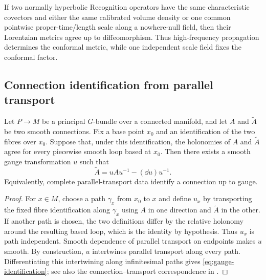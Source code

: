 \begin{corollary}
If two normally hyperbolic Recognition operators have the same characteristic covectors and either the same calibrated volume density or one common pointwise proper-time/length scale along a nowhere-null field, then their Lorentzian metrics agree up to diffeomorphism.  Thus high-frequency propagation determines the conformal metric, while one independent scale field fixes the conformal factor.
\end{corollary}

\subsection{Connection identification from parallel transport}

\begin{theorem}
\label{thm:connection-identification}
Let $P\to M$ be a principal $G$-bundle over a connected manifold, and let $A$ and $\widetilde A$ be two smooth connections.  Fix a base point $x_0$ and an identification of the two fibres over $x_0$.  Suppose that, under this identification, the holonomies of $A$ and $\widetilde A$ agree for every piecewise smooth loop based at $x_0$.  Then there exists a smooth gauge transformation $u$ such that
\begin{equation}
\widetilde A=uAu^{-1}-(\dd u)u^{-1}.
\label{eq:gauge-identification}
\end{equation}
Equivalently, complete parallel-transport data identify a connection up to gauge.
\end{theorem}

\begin{proof}
For $x\in M$, choose a path $\gamma_x$ from $x_0$ to $x$ and define $u_x$ by transporting the fixed fibre identification along $\gamma_x$ using $A$ in one direction and $\widetilde A$ in the other.  If another path is chosen, the two definitions differ by the relative holonomy around the resulting based loop, which is the identity by hypothesis.  Thus $u_x$ is path independent.  Smooth dependence of parallel transport on endpoints makes $u$ smooth.  By construction, $u$ intertwines parallel transport along every path.  Differentiating this intertwining along infinitesimal paths gives \eqref{eq:gauge-identification}; see also the connection--transport correspondence in \cite{KobayashiNomizu}.
\end{proof}


